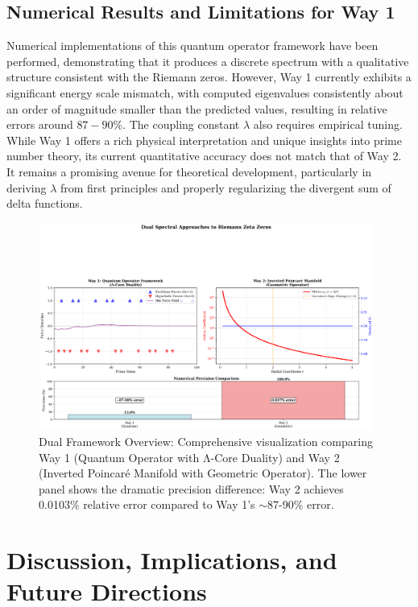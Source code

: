\documentclass[12pt]{article}
\begin{document}
\subsection{Numerical Results and Limitations for Way 1}
Numerical implementations of this quantum operator framework have been performed, demonstrating that it produces a discrete spectrum with a qualitative structure consistent with the Riemann zeros. However, Way 1 currently exhibits a significant energy scale mismatch, with computed eigenvalues consistently about an order of magnitude smaller than the predicted values, resulting in relative errors around $87-90\%$. The coupling constant $\lambda$ also requires empirical tuning.
While Way 1 offers a rich physical interpretation and unique insights into prime number theory, its current quantitative accuracy does not match that of Way 2. It remains a promising avenue for theoretical development, particularly in deriving $\lambda$ from first principles and properly regularizing the divergent sum of delta functions.

\begin{figure}[ht!]
\centering
\includegraphics[width=0.98\textwidth]{docs/dual_framework_overview.png}
\caption{Dual Framework Overview: Comprehensive visualization comparing Way 1 (Quantum Operator with Λ-Core Duality) and Way 2 (Inverted Poincaré Manifold with Geometric Operator). The lower panel shows the dramatic precision difference: Way 2 achieves 0.0103\% relative error compared to Way 1's $\sim$87-90\% error.}
\label{fig:dual_overview}
\end{figure}

\section{Discussion, Implications, and Future Directions}
\end{document}
